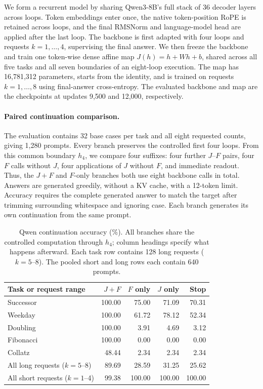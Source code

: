 \documentclass{article}
\begin{document}
We form a recurrent model by sharing Qwen3-8B's full stack of 36 decoder layers across loops. Token embeddings enter once, the native token-position RoPE is retained across loops, and the final RMSNorm and language-model head are applied after the last loop. The backbone is first adapted with four loops and requests $k=1,\ldots,4$, supervising the final answer. We then freeze the backbone and train one token-wise dense affine map $J(h)=h+Wh+b$, shared across all five tasks and all seven boundaries of an eight-loop execution. The map has 16,781,312 parameters, starts from the identity, and is trained on requests $k=1,\ldots,8$ using final-answer cross-entropy. The evaluated backbone and map are the checkpoints at updates 9,500 and 12,000, respectively.

\paragraph{Paired continuation comparison.}
The evaluation contains 32 base cases per task and all eight requested counts, giving 1,280 prompts. Every branch preserves the controlled first four loops. From this common boundary $h_4$, we compare four suffixes: four further $J$--$F$ pairs, four $F$ calls without $J$, four applications of $J$ without $F$, and immediate readout. Thus, the $J+F$ and $F$-only branches both use eight backbone calls in total. Answers are generated greedily, without a KV cache, with a 12-token limit. Accuracy requires the complete generated answer to match the target after trimming surrounding whitespace and ignoring case. Each branch generates its own continuation from the same prompt.

\begin{table}[!htbp]
\centering
\caption{Qwen continuation accuracy (\%). All branches share the controlled computation through $h_4$; column headings specify what happens afterward. Each task row contains 128 long requests ($k=5$--8). The pooled short and long rows each contain 640 prompts.}
\label{tab:qwen-additional-control}
\begin{tabular}{@{}lrrrr@{}}\toprule
Task or request range & $J+F$ & $F$ only & $J$ only & Stop\\\midrule
Successor & 100.00 & 75.00 & 71.09 & 70.31\\
Weekday & 100.00 & 61.72 & 78.12 & 52.34\\
Doubling & 100.00 & 3.91 & 4.69 & 3.12\\
Fibonacci & 100.00 & 0.00 & 0.00 & 0.00\\
Collatz & 48.44 & 2.34 & 2.34 & 2.34\\\midrule
All long requests ($k=5$--8) & 89.69 & 28.59 & 31.25 & 25.62\\
All short requests ($k=1$--4) & 99.38 & 100.00 & 100.00 & 100.00\\
\bottomrule\end{tabular}
\end{table}
\end{document}
